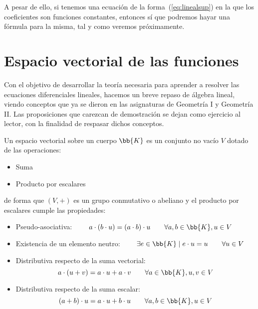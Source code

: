A pesar de ello, si tenemos una ecuación de la forma~(\ref{eq:linealsup}) en la que los coeficientes son funciones constantes, entonces sí que podremos hayar una fórmula para la misma, tal y como veremos próximamente.

\section{Espacio vectorial de las funciones}
Con el objetivo de desarrollar la teoría necesaria para aprender a resolver las ecuaciones diferenciales lineales, hacemos un breve repaso de álgebra lineal, viendo conceptos que ya se dieron en las asignaturas de Geometría I y Geometría II\@. Las proposiciones que carezcan de demostración se dejan como ejercicio al lector, con la finalidad de respasar dichos conceptos.

\begin{definicion}
    Un espacio vectorial sobre un cuerpo $\bb{K}$ es un conjunto no vacío $V$ dotado de las operaciones:
    \begin{itemize}
        \item Suma 
        \item Producto por escalares
    \end{itemize}
    de forma que $(V,+)$ es un grupo conmutativo o abeliano y el producto por escalares cumple las propiedades:
    \begin{itemize}
        \item Pseudo-asociativa: $\qquad a\cdot (b\cdot u) = (a\cdot b)\cdot u \qquad \forall a,b\in \bb{K}, u\in V$
        \item Existencia de un elemento neutro: $\qquad \exists e\in \bb{K} \mid e\cdot u = u \qquad \forall u\in V$
        \item Distributiva respecto de la suma vectorial:
            \begin{equation*}
                a\cdot (u+v) = a\cdot u + a\cdot v \qquad \forall a\in \bb{K}, u,v\in V
            \end{equation*}
        \item Distributiva respecto de la suma escalar:
            \begin{equation*}
                (a+b)\cdot u = a\cdot u + b\cdot u \qquad \forall a,b\in \bb{K}, u\in V
            \end{equation*} 
    \end{itemize}
\end{definicion}

